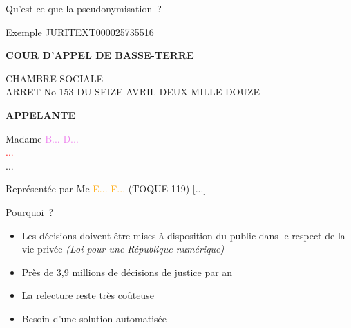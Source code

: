 \documentclass[10pt]{beamer}
\begin{document}
\begin{frame}{Qu'est-ce que la pseudonymisation~?}
\begin{block}{Exemple JURITEXT000025735516}
	\newline
	
	\textbf{COUR D'APPEL DE BASSE-TERRE}
	
	
	CHAMBRE SOCIALE \\
	ARRET No 153 DU SEIZE AVRIL DEUX MILLE DOUZE
	\newline
	
	\textbf{APPELANTE}
	
	Madame \textcolor{violet}{B... D...}\\
	\textcolor{red}{...}\\
	\textcolor{black}{...}
	
	Représentée par Me \textcolor{orange}{E... F...} (TOQUE 119) [...]
\end{block}
\end{frame}



\begin{frame}{Pourquoi~?}
\begin{itemize}	
	\item<1-> Les décisions doivent être mises à disposition du public dans le respect de la vie privée {\textit{(Loi pour une République numérique)}}
	\item<2-> Près de 3,9 millions de décisions de justice par an
	\item<3-> La relecture reste très coûteuse 
	\item<4-> Besoin d'une solution automatisée
\end{itemize}
\end{frame}
\end{document}
